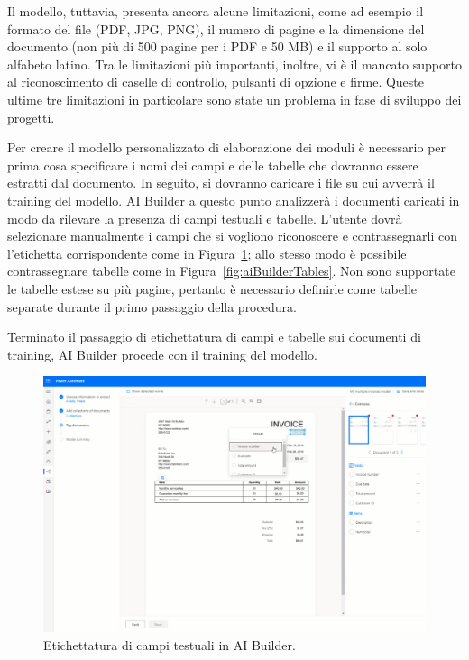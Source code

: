 Il modello, tuttavia, presenta ancora alcune limitazioni, come ad esempio il formato del file (PDF, JPG, PNG), il numero di pagine  e la dimensione del documento (non più di 500 pagine per i PDF e 50 MB) e il supporto al solo alfabeto latino.
Tra le limitazioni più importanti, inoltre, vi è il mancato supporto al riconoscimento di caselle di controllo, pulsanti di opzione e firme. Queste ultime tre limitazioni in particolare sono state un problema in fase di sviluppo dei progetti.~\cite{LimitazioniAIBuilder}

Per creare il modello personalizzato di elaborazione dei moduli è necessario per prima cosa specificare i nomi dei campi e delle tabelle che dovranno essere estratti dal documento.
In seguito, si dovranno caricare i file su cui avverrà il training del modello. AI Builder a questo punto analizzerà i documenti caricati in modo da rilevare la presenza di campi testuali e tabelle.
L'utente dovrà  selezionare manualmente i campi che si vogliono riconoscere e contrassegnarli con l'etichetta corrispondente come in Figura~\ref{fig:aiBuilderFields}; allo stesso modo è possibile contrassegnare tabelle come in Figura~\ref{fig:aiBuilderTables}. Non sono supportate le tabelle estese su più pagine, pertanto è necessario definirle come tabelle separate durante il primo passaggio della procedura.

Terminato il passaggio di etichettatura di campi e tabelle sui documenti di training, AI Builder procede con il training del modello.

\begin{figure}[ht]
  \centering
  \includegraphics[width=\textwidth]{ai-builder-fields.png}
  \caption{Etichettatura di campi testuali in AI Builder.}
  \label{fig:aiBuilderFields}
\end{figure}

